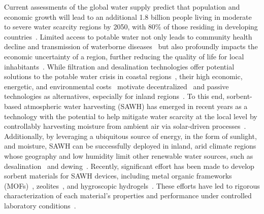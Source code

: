 \documentclass[11pt]{article}
\begin{document}
Current assessments of the global water supply predict that population and economic growth will lead to an additional 1.8 billion people living in moderate to severe water scarcity regions by 2050, with 80\% of those residing in developing countries~\cite{schlosser2014}. Limited access to potable water not only leads to community health decline and transmission of waterborne diseases~\cite{sharma2017} but also profoundly impacts the economic uncertainty of a region, further reducing the quality of life for local inhabitants~\cite{dolan2021}. While filtration and desalination technologies offer potential solutions to the potable water crisis in coastal regions~\cite{elmaadawy2020}, their high economic, energetic, and environmental costs~\cite{ghaffour2013} motivate decentralized~\cite{fukuda2019} and passive technologies as alternatives, especially for inland regions~\cite{rao2022}. To this end, sorbent-based atmospheric water harvesting (SAWH) has emerged in recent years as a technology with the potential to help mitigate water scarcity at the local level by controllably harvesting moisture from ambient air via solar-driven processes~\cite{lord2021,zeng2024,zhang2022}. Additionally, by leveraging a ubiquitous source of energy, in the form of sunlight, and moisture, SAWH can be successfully deployed in inland, arid climate regions whose geography and low humidity limit other renewable water sources, such as desalination~\cite{curto2021} and dewing~\cite{lee2012}. Recently, significant effort has been made to develop sorbent materials for SAWH devices, including metal organic frameworks (MOFs)~\cite{kalmutzki2018}, zeolites~\cite{kayal2016}, and hygroscopic hydrogels~\cite{kallenberger2018,zhao2019,diazmarin2022a,guo2020,li2023}. These efforts have led to rigorous characterization of each material's properties and performance under controlled laboratory conditions~\cite{zhong2024}.
\end{document}
